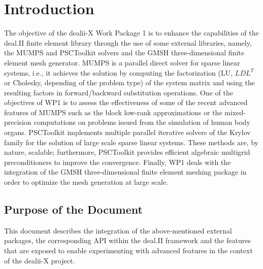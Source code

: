 \documentclass[a4paper,12pt]{article}
\begin{document}
\vspace*{2cm}

\disclaimer

\newpage

\tableofcontents %

\newpage

\section{{Introduction}}

The objective of the dealii-X Work Package 1 is to enhance the
capabilities of the deal.II finite element library through the use of
some external libraries, namely, the MUMPS and PSCToolkit solvers and
the GMSH three-dimensional finite element mesh generator. MUMPS is a
parallel direct solver for sparse linear systems, i.e., it achieves
the solution by computing the factorization (LU, $LDL^T$ or Cholesky,
depending of the problem type) of the system matrix and using the
resulting factors in forward/backward substitution operations. One of
the objectives of WP1 is to assess the effectiveness of some of the
recent advanced features of MUMPS such as the block low-rank
approximations or the mixed-precision computations on problems issued
from the simulation of human body organs. PSCToolkit implements
multiple parallel iterative solvers of the Krylov family for the
solution of large scale sparse linear systems. These methods are, by
nature, scalable; furthermore, PSCToolkit provides efficient algebraic
multigrid preconditioners to improve the convergence. Finally, WP1
deals with the integration of the GMSH three-dimensional finite
element meshing package in order to optimize the mesh generation at
large scale.

\subsection{{Purpose of the Document}}
This document describes the integration of the above-mentioned
external packages, the corresponding API within the deal.II framework
and the features that are exposed to enable experimenting with
advanced features in the context of the dealii-X project.

\end{document}

